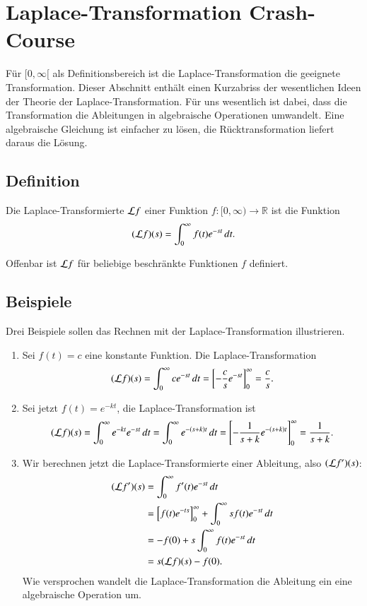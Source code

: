 %
%
%
\section{Laplace-Transformation Crash-Course}
Für $[0,\infty[$ als Definitionsbereich ist die Laplace-Transformation
die geeignete Transformation. Dieser Abschnitt enthält einen Kurzabriss
der wesentlichen Ideen der Theorie der Laplace-Transformation.
Für uns wesentlich ist dabei, dass die Transformation die Ableitungen
in algebraische Operationen umwandelt. Eine algebraische Gleichung ist
einfacher zu lösen, die Rücktransformation liefert daraus die Lösung.

\subsection{Definition}
\begin{definition}
Die Laplace-Transformierte ${\cal L}f$ einer Funktion
$f\colon[0,\infty)\to\mathbb R$ ist die Funktion
\[
({\cal L}f)(s)=\int_0^\infty f(t)e^{-st}\,dt.
\]
\end{definition}
Offenbar ist ${\cal L}f$ für beliebige beschränkte Funktionen $f$ definiert.

\subsection{Beispiele}
Drei Beispiele sollen das Rechnen mit der Laplace-Transformation
illustrieren.
\begin{enumerate}
\item
Sei $f(t)=c$ eine konstante Funktion. Die Laplace-Transformation
\[
({\cal L}f)(s)
=
\int_0^\infty ce^{-st}\,dt
=
\left[
-\frac{c}{s}e^{-st}
\right]_0^\infty=\frac{c}{s}.
\]

\item
Sei jetzt $f(t)=e^{-kt}$, die Laplace-Transformation ist
\[
({\cal L}f)(s)=\int_0^\infty e^{-kt}e^{-st}\,dt
=\int_0^{\infty}e^{-(s+k)t}\,dt
=
\left[
- \frac1{s+k}e^{-(s+k)t}
\right]_0^\infty
=\frac1{s+k}.
\]

\item
Wir berechnen jetzt die Laplace-Transformierte einer Ableitung, also
$({\cal L}f')(s)$:
\begin{align*}
({\cal L}f')(s)
&=
\int_0^\infty f'(t)e^{-st}\,dt
\\
&=
\left[f(t)e^{-ts}\right]_0^\infty
+
\int_0^\infty sf(t)e^{-st}\,dt
\\
&=
-f(0)+s\int_0^\infty f(t)e^{-st}\,dt
\\
&=s({\cal L}f)(s)-f(0).
\end{align*}
Wie versprochen wandelt die Laplace-Transformation die Ableitung
ein eine algebraische Operation um.
\end{enumerate}


